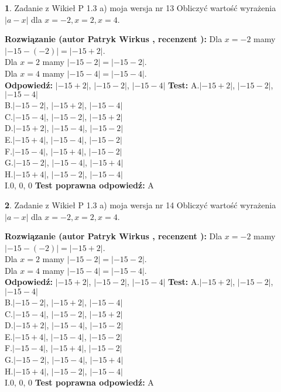 \documentclass[12pt, a4paper]{article}
\theoremstyle{definition} %
\newtheorem{zad}{}
\newcommand{\zadStart}[1]{\begin{zad}#1\newline}
\newcommand{\zadStop}{\end{zad}}
\newcommand{\rozwStart}[2]{\noindent \textbf{Rozwiązanie (autor #1 , recenzent #2): }\newline}
\newcommand{\rozwStop}{\newline}
\newcommand{\odpStart}{\noindent \textbf{Odpowiedź:}\newline}
\newcommand{\odpStop}{\newline}
\newcommand{\testStart}{\noindent \textbf{Test:}\newline}
\newcommand{\testStop}{\newline}
\newcommand{\kluczStart}{\noindent \textbf{Test poprawna odpowiedź:}\newline}
\newcommand{\kluczStop}{\newline}
\begin{document}
\zadStart{Zadanie z Wikieł P 1.3 a) moja wersja nr 13}
Obliczyć wartość wyrażenia $|a - x|$ dla $x=-2,x=2,x=4$.
\zadStop
\rozwStart{Patryk Wirkus}{}
Dla $x = -2$ mamy $|-15 - (-2)| = |-15 + 2|$.\\
Dla $x = 2$ mamy $|-15 - 2| = |-15 - 2|$.\\
Dla $x = 4$ mamy $|-15 - 4| = |-15 - 4|$.\\
\rozwStop
\odpStart
$|-15 + 2|$, $|-15 - 2|$, $|-15 - 4|$
\odpStop
\testStart
A.$|-15 + 2|$, $|-15 - 2|$, $|-15 - 4|$\\
B.$|-15 - 2|$, $|-15 + 2|$, $|-15 - 4|$\\
C.$|-15 - 4|$, $|-15 - 2|$, $|-15 + 2|$\\
D.$|-15 + 2|$, $|-15 - 4|$, $|-15 - 2|$\\
E.$|-15 + 4|$, $|-15 - 4|$, $|-15 - 2|$\\
F.$|-15 - 4|$, $|-15 + 4|$, $|-15 - 2|$\\
G.$|-15 - 2|$, $|-15 - 4|$, $|-15 + 4|$\\
H.$|-15 + 4|$, $|-15 - 2|$, $|-15 - 4|$\\
I.$0$, $0$, $0$
\testStop
\kluczStart
A
\kluczStop



\zadStart{Zadanie z Wikieł P 1.3 a) moja wersja nr 14}
Obliczyć wartość wyrażenia $|a - x|$ dla $x=-2,x=2,x=4$.
\zadStop
\rozwStart{Patryk Wirkus}{}
Dla $x = -2$ mamy $|-15 - (-2)| = |-15 + 2|$.\\
Dla $x = 2$ mamy $|-15 - 2| = |-15 - 2|$.\\
Dla $x = 4$ mamy $|-15 - 4| = |-15 - 4|$.\\
\rozwStop
\odpStart
$|-15 + 2|$, $|-15 - 2|$, $|-15 - 4|$
\odpStop
\testStart
A.$|-15 + 2|$, $|-15 - 2|$, $|-15 - 4|$\\
B.$|-15 - 2|$, $|-15 + 2|$, $|-15 - 4|$\\
C.$|-15 - 4|$, $|-15 - 2|$, $|-15 + 2|$\\
D.$|-15 + 2|$, $|-15 - 4|$, $|-15 - 2|$\\
E.$|-15 + 4|$, $|-15 - 4|$, $|-15 - 2|$\\
F.$|-15 - 4|$, $|-15 + 4|$, $|-15 - 2|$\\
G.$|-15 - 2|$, $|-15 - 4|$, $|-15 + 4|$\\
H.$|-15 + 4|$, $|-15 - 2|$, $|-15 - 4|$\\
I.$0$, $0$, $0$
\testStop
\kluczStart
A
\kluczStop
\end{document}
